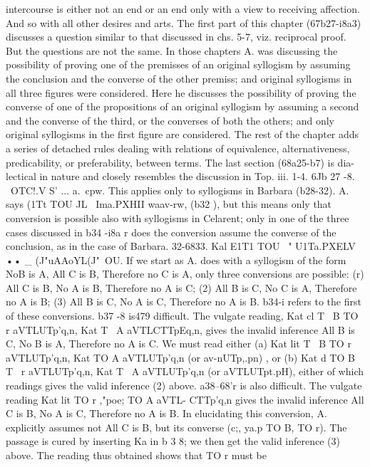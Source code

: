 {{{{{{{{intercourse is either not an end or an end only with a view to
receiving affection. And so with all other desires and arts.
The first part of this chapter (67b27-{i8a3) discusses a question
similar to that discussed in chs. 5-7, viz. reciprocal proof. But the
questions are not the same. In those chapters A. was discussing
the possibility of proving one of the premisses of an original
syllogism by assuming the conclusion and the converse of the
other premiss; and original syllogisms in all three figures were
considered. Here he discusses the possibility of proving the
converse of one of the propositions of an original syllogism by
assuming a second and the converse of the third, or the converses
of both the others; and only original syllogisms in the first figure
are considered.
The rest of the chapter adds a series of detached rules dealing
with relations of equivalence, alternativeness, predicability, or
preferability, between terms. The last section (68a25-b7) is dia-
lectical in nature and closely resembles the discussion in Top.
iii. 1-4.
6Jb 27 -8. ~OTC!.V S' ... a.~cpw. This applies only to syllogisms in
Barbara (b28-32). A. says (1Tt TOU JL~ Ima.PXHII waav-rw, (b32 ), but
this means only that conversion is possible also with syllogisms
in Celarent; only in one of the three cases discussed in b34 -{i8a r
does the conversion assume the converse of the conclusion, as
in the case of Barbara.
32-6833. Kal E1T1 TOU ~" U1Ta.PXELV •• _ (J"uAAoYL(J"~OU. If we
start as A. does with a syllogism of the form NoB is A, All C is
B, Therefore no C is A, only three conversions are possible: (r)
All C is B, No A is B, Therefore no A is C; (2) All B is C, No C is
A, Therefore no A is B; (3) All B is C, No A is C, Therefore no
A is B. b34-{i refers to the first of these conversions. b37 -8 is479
difficult. The vulgate reading, Kat cl T~ B TO r aVTLUTp'q,n, Kat
T~ A aVTLCTTpEq,n, gives the invalid inference All B is C, No B is
A, Therefore no A is C. We must read either (a) Kat lit T~ B TO
r aVTLUTp'q,n, Kat TO A aVTLUTp'q,n (or av-nUTp,.pn) , or (b) Kat d
TO B T~ r aVTLUTp'q,n, Kat T~ A aVTLUTp'q,n (or aVTLUTpt.pH), either
of which readings gives the valid inference (2) above. a38--68'r is
also difficult. The vulgate reading Kat lit TO r ,"poe; TO A aVTL-
CTTp'q,n gives the invalid inference All C is B, No A is C, Therefore
no A is B. In elucidating this conversion, A. explicitly assumes
not All C is B, but its converse (c;, ya.p TO B, TO r). The passage
is cured by inserting Ka{ in b 3 8; we then get the valid inference
(3) above. The reading thus obtained shows that TO r must be
}}}}}}}}}}}}
